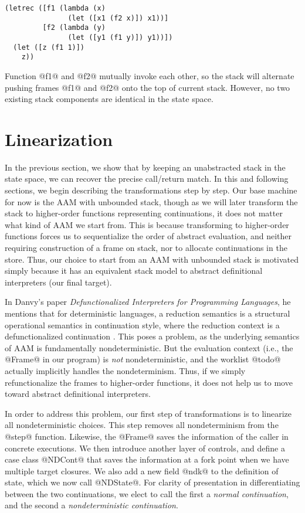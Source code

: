 \documentclass[acmsmall]{acmart}\settopmatter{}
\begin{document}
\begin{lstlisting}
(letrec ([f1 (lambda (x)
               (let ([x1 (f2 x)]) x1))]
         [f2 (lambda (y)
               (let ([y1 (f1 y)]) y1))])
  (let ([z (f1 1)])
    z))
\end{lstlisting}

Function @f1@ and @f2@ mutually invoke each other, so the stack will
alternate pushing frames @f1@ and @f2@ onto the top of current stack.
However, no two existing stack components are identical in the state space.

\section{Linearization} \label{linear}

In the previous section, we show that by keeping an unabstracted stack in the state
space, we can recover the precise call/return match.
In this and following sections, we begin describing the transformations step by step.
Our base machine for now is the AAM with unbounded stack, though
as we will later transform the stack to higher-order functions
representing continuations, it does not matter what kind of AAM we start from.
This is because transforming to higher-order functions forces us to sequentialize
the order of abstract evaluation, and neither requiring construction of a frame on stack,
nor to allocate continuations in the store.
Thus, our choice to start from an AAM with unbounded stack is motivated simply because
it has an equivalent stack model to abstract definitional interpreters (our final target).

In Danvy's paper \textit{Defunctionalized Interpreters for Programming
  Languages}, he mentions that for deterministic languages, a reduction semantics
is a structural operational semantics in continuation style, where the reduction
context is a defunctionalized continuation \cite{Danvy:2008:DIP:1411204.1411206}.
This poses a problem, as the underlying semantics of AAM is fundamentally nondeterministic.
But the evaluation context (i.e., the @Frame@ in our program) is \emph{not}
nondeterministic, and the worklist @todo@ actually implicitly handles the nondeterminism.
Thus, if we simply refunctionalize the frames to higher-order functions, 
it does not help us to move toward abstract definitional interpreters.

In order to address this problem, our first step of transformations
is to linearize all nondeterministic choices.
This step removes all nondeterminism from the @step@ function.
Likewise, the @Frame@ saves the information of the caller in concrete executions.
We then introduce another layer of controls, and define a case class @NDCont@
that saves the information at a fork point when we have multiple target closures.
We also add a new field @ndk@ to the definition of state, which we now call @NDState@.
For clarity of presentation in differentiating between the two continuations, we elect to call
the first a \emph{normal continuation}, and the second a \emph{nondeterministic continuation}.
\end{document}
